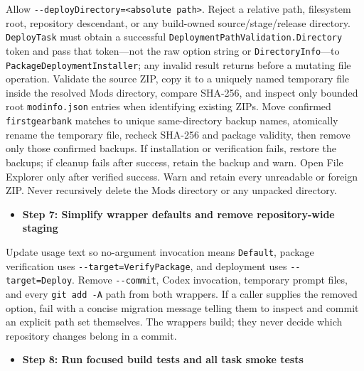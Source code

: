 \documentclass[
  10pt,
  letterpaper,
]{article}
\newcommand{\passthrough}[1]{#1}
\providecommand{\tightlist}{%
  \setlength{\itemsep}{0pt}\setlength{\parskip}{0pt}}
\begin{document}
Allow
\texttt{-}\allowbreak{}\texttt{-}\allowbreak{}\texttt{deployDirectory=}\allowbreak{}\texttt{\textless{}}\allowbreak{}\texttt{absolute\ }\allowbreak{}\texttt{path\textgreater{}}\allowbreak{}.
Reject a relative path, filesystem root, repository descendant, or any
build-owned source/\allowbreak{}stage/\allowbreak{}release directory.
\passthrough{\lstinline!DeployTask!} must obtain a successful
\texttt{DeploymentPathValidation.}\allowbreak{}\texttt{Directory} token
and pass that token---not the raw option string or
\passthrough{\lstinline!DirectoryInfo!}---to
\texttt{PackageDeploymentInstaller}; any invalid result returns before a
mutating file operation. Validate the source ZIP, copy it to a uniquely
named temporary file inside the resolved Mods directory, compare
SHA-256, and inspect only bounded root
\passthrough{\lstinline!modinfo.json!} entries when identifying existing
ZIPs. Move confirmed \passthrough{\lstinline!firstgearbank!} matches to
unique same-directory backup names, atomically rename the temporary
file, recheck SHA-256 and package validity, then remove only those
confirmed backups. If installation or verification fails, restore the
backups; if cleanup fails after success, retain the backup and warn.
Open File Explorer only after verified success. Warn and retain every
unreadable or foreign ZIP. Never recursively delete the Mods directory
or any unpacked directory.

\begin{itemize}
\tightlist
\item[$\square$]
  \textbf{Step 7: Simplify wrapper defaults and remove repository-wide
  staging}
\end{itemize}

Update usage text so no-argument invocation means
\passthrough{\lstinline!Default!}, package verification uses
\passthrough{\lstinline!--target=VerifyPackage!}, and deployment uses
\passthrough{\lstinline!--target=Deploy!}. Remove
\passthrough{\lstinline!--commit!}, Codex invocation, temporary prompt
files, and every \passthrough{\lstinline!git add -A!} path from both
wrappers. If a caller supplies the removed option, fail with a concise
migration message telling them to inspect and commit an explicit path
set themselves. The wrappers build; they never decide which repository
changes belong in a commit.

\begin{itemize}
\tightlist
\item[$\square$]
  \textbf{Step 8: Run focused build tests and all task smoke tests}
\end{itemize}
\end{document}
